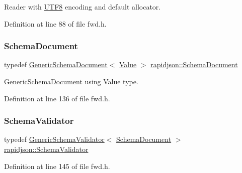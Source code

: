 Reader with \mbox{\hyperlink{structrapidjson_1_1_u_t_f8}{U\+T\+F8}} encoding and default allocator. 



Definition at line 88 of file fwd.\+h.

\mbox{\label{namespacerapidjson_a52bbb5d64d1319495089e1713a0653cf}} 
\subsubsection{\texorpdfstring{SchemaDocument}{SchemaDocument}}
{\footnotesize\ttfamily typedef \mbox{\hyperlink{classrapidjson_1_1_generic_schema_document}{Generic\+Schema\+Document}}$<$ \mbox{\hyperlink{namespacerapidjson_aa65fc9fb381b2cbc54f98673eadd6505}{Value}} $>$ \mbox{\hyperlink{namespacerapidjson_a52bbb5d64d1319495089e1713a0653cf}{rapidjson\+::\+Schema\+Document}}}



\mbox{\hyperlink{classrapidjson_1_1_generic_schema_document}{Generic\+Schema\+Document}} using Value type. 



Definition at line 136 of file fwd.\+h.

\mbox{\label{namespacerapidjson_a38dbb50c156f67adc0a70548d5572ccf}} 
\subsubsection{\texorpdfstring{SchemaValidator}{SchemaValidator}}
{\footnotesize\ttfamily typedef \mbox{\hyperlink{classrapidjson_1_1_generic_schema_validator}{Generic\+Schema\+Validator}}$<$ \mbox{\hyperlink{namespacerapidjson_a52bbb5d64d1319495089e1713a0653cf}{Schema\+Document}} $>$ \mbox{\hyperlink{namespacerapidjson_a38dbb50c156f67adc0a70548d5572ccf}{rapidjson\+::\+Schema\+Validator}}}



Definition at line 145 of file fwd.\+h.

\mbox{\label{namespacerapidjson_a44eb33eaa523e36d466b1ced64b85c84}} 
